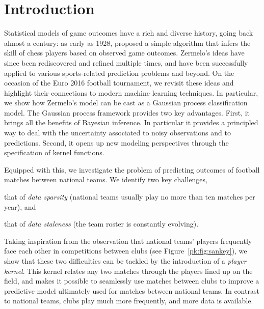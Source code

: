 \section{Introduction}
\label{pk:sec:intro}


Statistical models of game outcomes have a rich and diverse history, going back almost a century:
as early as 1928, \citep{zermelo1928berechnung} proposed a simple algorithm that infers the skill of chess players based on observed game outcomes.
Zermelo's ideas have since been rediscovered and refined multiple times, and have been successfully applied to various sports-related prediction problems and beyond.
On the occasion of the Euro 2016 football tournament, we revisit these ideas and highlight their connections to modern machine learning techniques.
In particular, we show how Zermelo's model can be cast as a Gaussian process classification model.
The Gaussian process framework provides two key advantages.
First, it brings all the benefits of Bayesian inference. In particular it provides a principled way to deal with the uncertainty associated to noisy observations and to predictions.
Second, it opens up new modeling perspectives through the specification of kernel functions.

Equipped with this, we investigate the problem of predicting outcomes of football matches between national teams.
We identify two key challenges,
\begin{enuminline}
\item that of \emph{data sparsity} (national teams usually play no more than ten matches per year), and
\item that of \emph{data staleness} (the team roster is constantly evolving).
\end{enuminline}
Taking inspiration from the observation that national teams' players frequently face each other in competitions between clubs (see Figure~\ref{pk:fig:sankey}), we show that these two difficulties can be tackled by the introduction of a \emph{player kernel}.
This kernel relates any two matches through the players lined up on the field, and makes it possible to seamlessly use matches between clubs to improve a predictive model ultimately used for matches between national teams.
In contrast to national teams, clubs play much more frequently, and more data is available.

